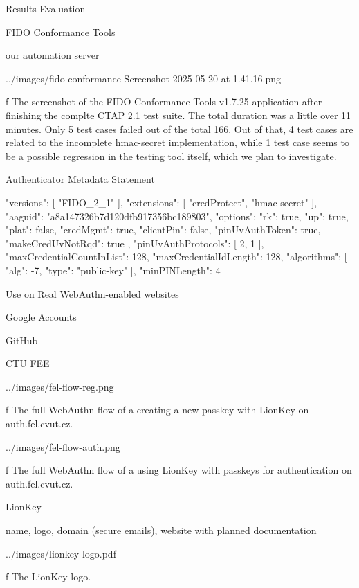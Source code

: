 \chap[evaluation] Results Evaluation


\sec FIDO Conformance Tools

our automation server

\midinsert
{}
\picw=144mm \cinspic ../images/fido-conformance-Screenshot-2025-05-20-at-1.41.16.png
\caption/f The screenshot of the FIDO Conformance Tools v1.7.25 application after finishing the complte CTAP 2.1 test suite. The total duration was a little over 11 minutes. Only 5 test cases failed out of the total 166. Out of that, 4 test cases are related to the incomplete hmac-secret implementation, while 1 test case seems to be a possible regression in the testing tool itself, which we plan to investigate.
\endinsert

\secc Authenticator Metadata Statement

\begtt
{
	"versions": [
		"FIDO_2_1"
	],
	"extensions": [
		"credProtect",
		"hmac-secret"
	],
	"aaguid": "a8a147326b7d120dfb917356bc189803",
	"options": {
		"rk": true,
		"up": true,
		"plat": false,
		"credMgmt": true,
		"clientPin": false,
		"pinUvAuthToken": true,
		"makeCredUvNotRqd": true
	},
	"pinUvAuthProtocols": [
		2,
		1
	],
	"maxCredentialCountInList": 128,
	"maxCredentialIdLength": 128,
	"algorithms": [
		{
			"alg": -7,
			"type": "public-key"
		}
	],
	"minPINLength": 4
}
\endtt


\sec Use on Real WebAuthn-enabled websites

Google Accounts

GitHub

\secc CTU FEE

\midinsert
{}
\picw=144mm \cinspic ../images/fel-flow-reg.png
\caption/f The full WebAuthn flow of a creating a new passkey with LionKey on auth.fel.cvut.cz.
\endinsert


\midinsert
{}
\picw=144mm \cinspic ../images/fel-flow-auth.png
\caption/f The full WebAuthn flow of a using LionKey with passkeys for authentication on auth.fel.cvut.cz.
\endinsert



\sec LionKey

name, logo, domain (secure emails), website with planned documentation




\midinsert
{}
\picheight=45mm \cinspic ../images/lionkey-logo.pdf
\caption/f The LionKey logo.
\endinsert




